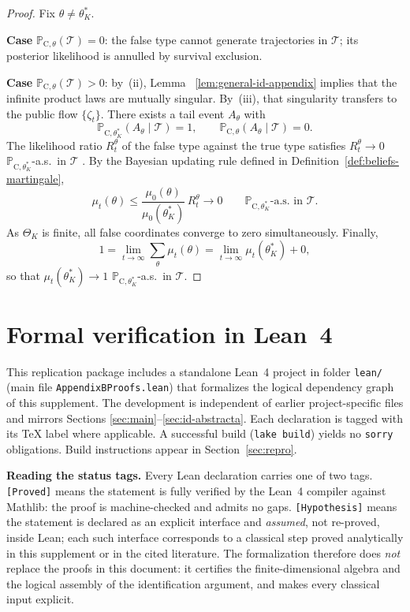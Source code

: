 \documentclass[ecta,nameyear,final,supplement]{econsocart}
\numberwithin{equation}{section}
\numberwithin{table}{section}
\theoremstyle{definition}
\newcommand{\ProbC}[1]{\mathbb{P}_{\mathrm{C},#1}}
\begin{document}
\begin{proof}
Fix $\theta\neq\theta_K^\ast$.

\textbf{Case} $\ProbC{\theta}(\mathcal{T})=0$: the false type cannot generate
trajectories in $\mathcal{T}$; its posterior likelihood is annulled by survival
exclusion.

\textbf{Case} $\ProbC{\theta}(\mathcal{T})>0$: by~(ii), Lemma
~\ref{lem:general-id-appendix} implies that the infinite product laws are
mutually singular. By~(iii), that singularity transfers to the public flow
$\{\zeta_t\}$. There exists a tail event $A_\theta$ with
\[
\ProbC{\theta_K^\ast}(A_\theta\mid\mathcal{T})=1,\qquad
\ProbC{\theta}(A_\theta\mid\mathcal{T})=0.
\]
The likelihood ratio $R_t^\theta$ of the false type against the true type
satisfies $R_t^\theta\to 0$ $\ProbC{\theta_K^\ast}$-a.s.\ in $\mathcal{T}$
\citep{BlackwellDubins1962,Schervish1995Theory}. By the Bayesian updating rule defined in Definition~\ref{def:beliefs-martingale},
\[
\mu_t(\theta)
\le\frac{\mu_0(\theta)}{\mu_0(\theta_K^\ast)}\,R_t^\theta\to 0
\qquad\ProbC{\theta_K^\ast}\text{-a.s.\ in }\mathcal{T}.
\]
As $\Theta_K$ is finite, all false coordinates converge to zero
simultaneously. Finally,
\[
1=\lim_{t\to\infty}\sum_\theta\mu_t(\theta)
=\lim_{t\to\infty}\mu_t(\theta_K^\ast)+0,
\]
so that $\mu_t(\theta_K^\ast)\to 1$ $\ProbC{\theta_K^\ast}$-a.s.\ in
$\mathcal{T}$.
\end{proof}

\section{Formal verification in Lean~4}
\label{sec:lean-formalization}

\begin{sloppypar}
\noindent
This replication package includes a standalone Lean~4 project in folder
\texttt{lean/} (main file \texttt{AppendixBProofs.lean}) that
formalizes the logical dependency graph of this supplement. The development is
independent of earlier project-specific files and mirrors Sections
\ref{sec:main}--\ref{sec:id-abstracta}. Each declaration is tagged with its TeX
label where applicable. A successful build (\texttt{lake build}) yields no
\texttt{sorry} obligations. Build instructions appear in Section~\ref{sec:repro}.
\end{sloppypar}

\medskip
\noindent\textbf{Reading the status tags.}
Every Lean declaration carries one of two tags. \texttt{[Proved]} means the
statement is fully verified by the Lean~4 compiler against Mathlib: the proof
is machine-checked and admits no gaps. \texttt{[Hypothesis]} means the
statement is declared as an explicit interface and \emph{assumed}, not
re-proved, inside Lean; each such interface corresponds to a classical step
proved analytically in this supplement or in the cited literature. The
formalization therefore does \emph{not} replace the proofs in this document:
it certifies the finite-dimensional algebra and the logical assembly of the
identification argument, and makes every classical input explicit.
\end{document}
